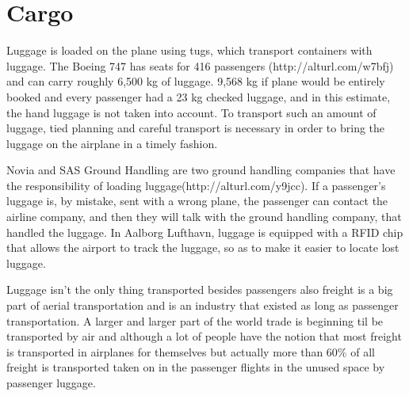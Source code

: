 \section{Cargo}
Luggage is loaded on the plane using tugs, which transport containers with luggage. The Boeing 747 has seats for 416 passengers (http://alturl.com/w7bfj) and can carry roughly 6,500 kg of luggage. %
9,568 kg if plane would be entirely booked and every passenger had a 23 kg checked luggage, and in this estimate, the hand luggage is not taken into account. To transport such an amount of luggage, tied planning and careful transport is necessary in order to bring the luggage on the airplane in a timely fashion. %


Novia and SAS Ground Handling are two ground handling companies that have the responsibility of loading luggage(http://alturl.com/y9jcc). If a passenger's luggage is, by mistake, sent with a wrong plane, the passenger can contact the airline company, and then they will talk with the ground handling company, that handled the luggage. In Aalborg Lufthavn, luggage is equipped with a RFID chip that allows the airport to track the luggage, so as to make it easier to locate lost luggage.


Luggage isn't the only thing transported besides passengers also freight is a big part of aerial transportation and is an industry that existed as long as passenger transportation. A larger and larger part of the world trade is beginning til be transported by air and although a lot of people have the notion that most freight is transported in airplanes for themselves but actually more than 60\% of all freight is transported taken on in the passenger flights in the unused space by passenger luggage.


